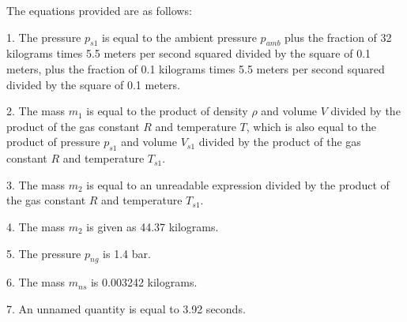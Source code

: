 The equations provided are as follows:

1. The pressure \( p_{s1} \) is equal to the ambient pressure \( p_{amb} \) plus the fraction of 32 kilograms times 5.5 meters per second squared divided by the square of 0.1 meters, plus the fraction of 0.1 kilograms times 5.5 meters per second squared divided by the square of 0.1 meters.

2. The mass \( m_1 \) is equal to the product of density \( \rho \) and volume \( V \) divided by the product of the gas constant \( R \) and temperature \( T \), which is also equal to the product of pressure \( p_{s1} \) and volume \( V_{s1} \) divided by the product of the gas constant \( R \) and temperature \( T_{s1} \).

3. The mass \( m_2 \) is equal to an unreadable expression divided by the product of the gas constant \( R \) and temperature \( T_{s1} \).

4. The mass \( m_2 \) is given as 44.37 kilograms.

5. The pressure \( p_{ng} \) is 1.4 bar.

6. The mass \( m_{ns} \) is 0.003242 kilograms.

7. An unnamed quantity is equal to 3.92 seconds.